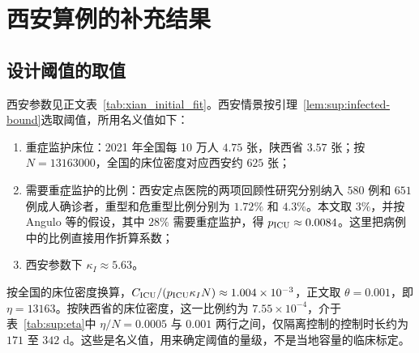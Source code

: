 \section{西安算例的补充结果}
\label{sec:sup:xian}
\subsection{设计阈值的取值}
\label{sec:sup:threshold-scale}
西安参数见正文表~\ref{tab:xian_initial_fit}。西安情景按引理~\ref{lem:sup:infected-bound}选取阈值，所用名义值如下：
\begin{enumerate}
\item 重症监护床位：2021 年全国每 10 万人 $4.75$ 张\cite{Yuan2024ICUBeds}，陕西省 $3.57$ 张\cite[补充文件 1]{Chen2024ICUEquity}；按 $N=\num{13163000}$\cite{XianStat2021}，全国的床位密度对应西安约 $625$ 张；
\item 需要重症监护的比例：西安定点医院的两项回顾性研究分别纳入 $580$ 例和 $651$ 例成人确诊者，重型和危重型比例分别为 $1.72\%$ 和 $4.3\%$\cite{Yang2022XianDelta,Lv2024XianDelta}。本文取 $3\%$，并按 Angulo 等\cite[补充材料 S4.1]{Angulo2021}的假设，其中 $28\%$ 需要重症监护，得 $p_{\rm ICU}\approx0.0084$。这里把病例中的比例直接用作折算系数；
\item 西安参数下 $\kappa_I\approx5.63$。
\end{enumerate}
按全国的床位密度换算，$C_{\rm ICU}/(p_{\rm ICU}\kappa_IN)\approx1.004\times10^{-3}$，正文取 $\theta=0.001$，即 $\eta=\num{13163}$。按陕西省的床位密度，这一比例约为 $7.55\times10^{-4}$，介于表~\ref{tab:sup:eta}中 $\eta/N=0.0005$ 与 $0.001$ 两行之间，仅隔离控制的控制时长约为 $171$ 至 $342$ d。这些是名义值，用来确定阈值的量级，不是当地容量的临床标定。

\FloatBarrier
